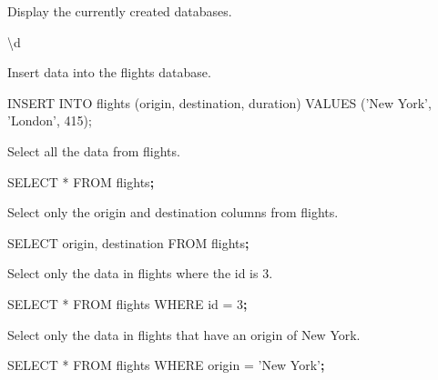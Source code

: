 \documentclass[]{book}
\newenvironment{Shaded}{\begin{snugshade}}{\end{snugshade}}
\newcommand{\KeywordTok}[1]{\textcolor[rgb]{0.13,0.29,0.53}{\textbf{#1}}}
\newcommand{\StringTok}[1]{\textcolor[rgb]{0.31,0.60,0.02}{#1}}
\newcommand{\ExtensionTok}[1]{#1}
\newcommand{\NormalTok}[1]{#1}
\begin{document}
Display the currently created databases.

\begin{Shaded}
\begin{Highlighting}[]
\NormalTok{\textbackslash{}}\ExtensionTok{d}
\end{Highlighting}
\end{Shaded}

Insert data into the flights database.

\begin{Shaded}
\begin{Highlighting}[]
\ExtensionTok{INSERT}\NormalTok{ INTO flights (origin, destination, duration) }\ExtensionTok{VALUES}\NormalTok{ (}\StringTok{'New York'}\NormalTok{, }\StringTok{'London'}\NormalTok{, 415);}
\end{Highlighting}
\end{Shaded}

Select all the data from flights.

\begin{Shaded}
\begin{Highlighting}[]
\ExtensionTok{SELECT}\NormalTok{ * FROM flights}\KeywordTok{;}
\end{Highlighting}
\end{Shaded}

Select only the origin and destination columns from flights.

\begin{Shaded}
\begin{Highlighting}[]
\ExtensionTok{SELECT}\NormalTok{ origin, destination FROM flights}\KeywordTok{;}
\end{Highlighting}
\end{Shaded}

Select only the data in flights where the id is 3.

\begin{Shaded}
\begin{Highlighting}[]
\ExtensionTok{SELECT}\NormalTok{ * FROM flights WHERE id = 3}\KeywordTok{;}
\end{Highlighting}
\end{Shaded}

Select only the data in flights that have an origin of New York.

\begin{Shaded}
\begin{Highlighting}[]
\ExtensionTok{SELECT}\NormalTok{ * FROM flights WHERE origin = }\StringTok{'New York'}\KeywordTok{;}
\end{Highlighting}
\end{Shaded}
\end{document}
